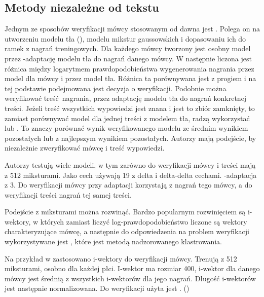 \subsection{Metody niezależne od tekstu}

Jednym ze sposobów weryfikacji mówcy stosowanym od dawna jest . Polega on na utworzeniu modelu tła
(), modelu mikstur gaussowskich i dopasowaniu ich do ramek  z nagrań
treningowych. Dla każdego mówcy tworzony jest osobny model przez -adaptację modelu tła do nagrań danego
mówcy. W \cite{utteranceVerificationFor}
następnie liczona jest różnica między logarytmem prawdopodobieństwa wygenerowania nagrania przez model
dla mówcy i przez model tła. Różnica ta porównywana jest z progiem i na tej podstawie podejmowana jest decyzja
o weryfikacji. Podobnie można weryfikować treść nagrania, przez adaptację modelu tła do nagrań konkretnej treści.
Jeżeli treść wszystkich wypowiedzi jest znana i jest to zbiór zamknięty, to zamiast porównywać model dla jednej
treści z modelem tła, radzą wykorzystać  lub . To znaczy porównać wynik weryfikowanego
modelu ze średnim wynikiem pozostałych lub z najlepszym wynikiem pozostałych. Autorzy mają podejście, by niezależnie
zweryfikować mówcę i treść wypowiedzi.

Autorzy testują wiele modeli, w tym zarówno do weryfikacji mówcy i treści mają  z 512 miksturami.
Jako cech używają 19  z delta i delta-delta cechami. -adaptacja z  3.
Do weryfikacji mówcy przy adaptacji korzystają z nagrań tego mówcy, a do weryfikacji treści nagrań tej samej treści.

Podejście z miksturami można rozwinąć. Bardzo popularnym rozwinięciem są i-wektory, w których
zamiast liczyć log-prawdopodobieństwo liczone są wektory charakteryzujące mówcę, a następnie do
odpowiedzenia na problem weryfikacji wykorzystywane
jest , które jest metodą nadzorowanego klastrowania.

Na przykład w \cite{utteranceVerificationFor}
zastosowano i-wektory do weryfikacji mówcy. Trenują  z 512 miksturami, osobno dla każdej płci.
I-wektor ma rozmiar 400, i-wektor dla danego mówcy jest średnią z wszystkich i-wektorów dla jego nagrań.
Długość i-wektorów jest następnie normalizowana. Do weryfikacji użyta jest .
()

